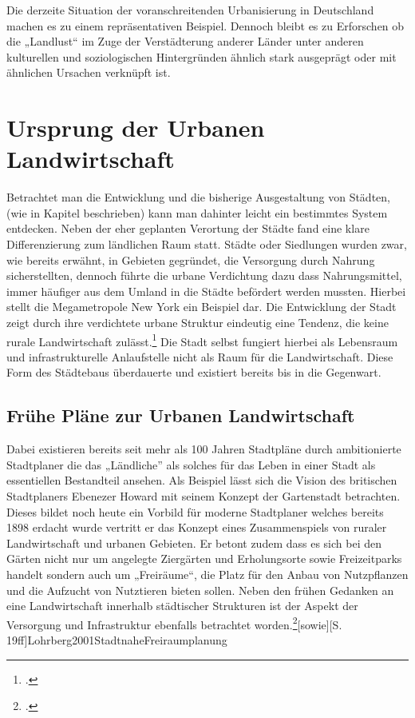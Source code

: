 \documentclass{scrartcl}
\begin{document}
Die derzeite Situation der voranschreitenden Urbanisierung in Deutschland machen es zu einem repräsentativen Beispiel. Dennoch bleibt es zu Erforschen ob die „Landlust“ im Zuge der Verstädterung anderer Länder unter anderen kulturellen und soziologischen Hintergründen ähnlich stark ausgeprägt oder mit ähnlichen Ursachen verknüpft ist.

\section{Ursprung der Urbanen Landwirtschaft}

Betrachtet man die Entwicklung und die bisherige Ausgestaltung von Städten, (wie in Kapitel \label{DieDistanzzwischenStadtbevölkerungundLandwirtschaft} beschrieben) kann man dahinter leicht ein bestimmtes System entdecken. Neben der eher geplanten Verortung der Städte fand eine klare Differenzierung zum ländlichen Raum statt. Städte oder Siedlungen wurden zwar, wie bereits erwähnt, in Gebieten gegründet, die Versorgung durch Nahrung sicherstellten, dennoch führte die urbane Verdichtung dazu dass Nahrungsmittel, immer häufiger aus dem Umland in die Städte befördert werden mussten. Hierbei stellt die Megametropole New York ein Beispiel dar. Die Entwicklung der Stadt zeigt durch ihre verdichtete urbane Struktur eindeutig eine Tendenz, die keine rurale Landwirtschaft zulässt.\footcite[Vgl.][S. 146]{MullerUrbanStadt} Die Stadt selbst fungiert hierbei als Lebensraum und infrastrukturelle Anlaufstelle nicht als Raum für die Landwirtschaft. Diese Form des Städtebaus überdauerte und existiert bereits bis in die Gegenwart.

\subsection{Frühe Pläne zur Urbanen Landwirtschaft}
Dabei existieren bereits seit mehr als 100 Jahren Stadtpläne durch ambitionierte Stadtplaner die das „Ländliche” als solches für das Leben in einer Stadt als essentiellen Bestandteil ansehen. Als Beispiel lässt sich die Vision des britischen Stadtplaners Ebenezer Howard mit seinem Konzept der Gartenstadt betrachten. Dieses bildet noch heute ein Vorbild für moderne Stadtplaner welches bereits 1898 erdacht wurde vertritt er das Konzept eines Zusammenspiels von ruraler Landwirtschaft und urbanen Gebieten. Er betont zudem dass es sich bei den Gärten nicht nur um angelegte Ziergärten und Erholungsorte sowie Freizeitparks handelt sondern auch um „Freiräume“, die Platz für den Anbau von Nutzpflanzen und die Aufzucht von Nutztieren bieten sollen. Neben den frühen Gedanken an eine Landwirtschaft innerhalb städtischer Strukturen ist der Aspekt der Versorgung und Infrastruktur ebenfalls betrachtet worden.\footcite[Vgl.][S. 144f]{MullerUrbanStadt}[sowie][S. 19ff]{Lohrberg2001StadtnaheFreiraumplanung}
\end{document}
